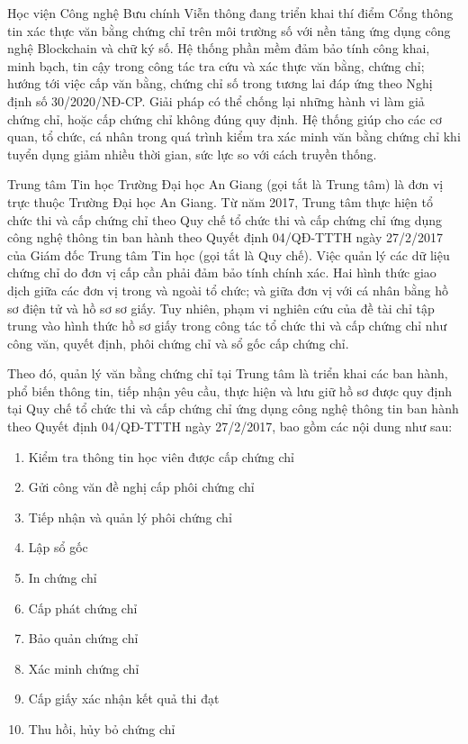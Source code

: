 Học viện Công nghệ Bưu chính Viễn thông đang triển khai thí điểm Cổng thông tin xác thực văn bằng chứng chỉ trên môi trường số với nền tảng ứng dụng công nghệ Blockchain và chữ ký số. Hệ thống phần mềm đảm bảo tính công khai, minh bạch, tin cậy trong công tác tra cứu và xác thực văn bằng, chứng chỉ; hướng tới việc cấp văn bằng, chứng chỉ số trong tương lai đáp ứng theo Nghị định số 30/2020/NĐ-CP. Giải pháp có thể chống lại những hành vi làm giả chứng chỉ, hoặc cấp chứng chỉ không đúng quy định. Hệ thống giúp cho các cơ quan, tổ chức, cá nhân trong quá trình kiểm tra xác minh văn bằng chứng chỉ khi tuyển dụng giảm nhiều thời gian, sức lực so với cách truyền thống.

Trung tâm Tin học Trường Đại học An Giang (gọi tắt là Trung tâm) là đơn vị trực thuộc Trường Đại học An Giang. Từ năm 2017, Trung tâm thực hiện tổ chức thi và cấp chứng chỉ theo Quy chế tổ chức thi và cấp chứng chỉ ứng dụng công nghệ thông tin ban hành theo Quyết định 04/QĐ-TTTH ngày 27/2/2017 của Giám đốc Trung tâm Tin học (gọi tắt là Quy chế). Việc quản lý các dữ liệu chứng chỉ do đơn vị cấp cần phải đảm bảo tính chính xác. Hai hình thức giao dịch giữa các đơn vị trong và ngoài tổ chức; và giữa đơn vị với cá nhân bằng hồ sơ điện tử và hồ sơ sơ giấy. Tuy nhiên, phạm vi nghiên cứu của đề tài chỉ tập trung vào hình thức hồ sơ giấy trong công tác tổ chức thi và cấp chứng chỉ như công văn, quyết định, phôi chứng chỉ và sổ gốc cấp chứng chỉ.

Theo đó, quản lý văn bằng chứng chỉ tại Trung tâm là triển khai các ban hành, phổ biến thông tin, tiếp nhận yêu cầu, thực hiện và lưu giữ hồ sơ được quy định tại Quy chế tổ chức thi và cấp chứng chỉ ứng dụng công nghệ thông tin ban hành theo Quyết định 04/QĐ-TTTH ngày 27/2/2017, bao gồm các nội dung như sau:

\begin{enumerate}
\item Kiểm tra thông tin học viên được cấp chứng chỉ
\item Gửi công văn đề nghị cấp phôi chứng chỉ
\item Tiếp nhận và quản lý phôi chứng chỉ
\item Lập sổ gốc
\item In chứng chỉ
\item Cấp phát chứng chỉ
\item Bảo quản chứng chỉ
\item Xác minh chứng chỉ
\item Cấp giấy xác nhận kết quả thi đạt
\item Thu hồi, hủy bỏ chứng chỉ
\end{enumerate}


